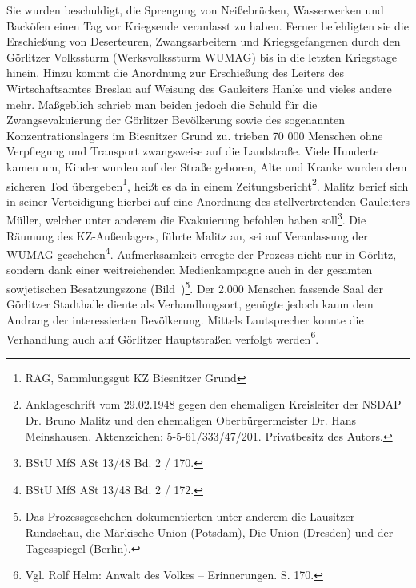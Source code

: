 Sie wurden beschuldigt, die Sprengung von Neißebrücken, Wasserwerken und Backöfen einen Tag vor Kriegsende veranlasst zu haben. Ferner befehligten sie die Erschießung von Deserteuren, Zwangsarbeitern und Kriegsgefangenen durch den Görlitzer Volkssturm (Werksvolkssturm WUMAG) bis in die letzten Kriegstage hinein. Hinzu kommt die Anordnung zur Erschießung des Leiters des Wirtschaftsamtes Breslau auf Weisung des Gauleiters Hanke und vieles andere mehr.
Maßgeblich schrieb man beiden jedoch die Schuld für die Zwangsevakuierung der Görlitzer Bevölkerung sowie des sogenannten Konzentrationslagers im Biesnitzer Grund zu. \glqq [Sie] trieben 70 000 Menschen ohne Verpflegung und Transport zwangsweise auf die Landstraße. Viele Hunderte kamen um, Kinder wurden auf der Straße geboren, Alte und Kranke wurden dem sicheren Tod übergeben\grqq\footnote{RAG, Sammlungsgut KZ Biesnitzer Grund}, heißt es da in einem Zeitungsbericht\footnote{Anklageschrift vom 29.02.1948 gegen den ehemaligen Kreisleiter der NSDAP Dr. Bruno Malitz und den ehemaligen Oberbürgermeister Dr. Hans Meinshausen. Aktenzeichen: 5-5-61/333/47/201. Privatbesitz des Autors.}. Malitz berief sich in seiner Verteidigung hierbei auf eine Anordnung des stellvertretenden Gauleiters Müller, welcher unter anderem die Evakuierung befohlen haben soll\footnote{BStU MfS ASt 13/48 Bd. 2 / 170.}. Die Räumung des KZ-Außenlagers, führte Malitz an, sei auf Veranlassung der WUMAG geschehen\footnote{BStU MfS ASt 13/48 Bd. 2 / 172.}.\newline 
Aufmerksamkeit erregte der Prozess nicht nur in Görlitz, sondern dank einer weitreichenden Medienkampagne auch in der gesamten sowjetischen Besatzungszone (Bild~)\footnote{Das Prozessgeschehen dokumentierten unter anderem die Lausitzer Rundschau, die Märkische Union (Potsdam), Die Union (Dresden) und der Tagesspiegel (Berlin).}. Der 2.000 Menschen fassende Saal der Görlitzer Stadthalle diente als Verhandlungsort, genügte jedoch kaum dem Andrang der interessierten Bevölkerung. Mittels Lautsprecher konnte die Verhandlung auch auf Görlitzer Hauptstraßen verfolgt werden\footnote{Vgl. Rolf Helm: Anwalt des Volkes -- Erinnerungen. S. 170.}. %
